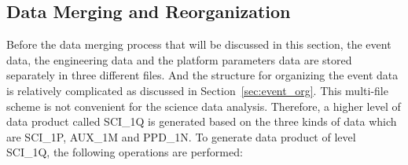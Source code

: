 \documentclass{raa}
\begin{document}
\subsection{Data Merging and Reorganization}\label{sec:data_merging}

Before the data merging process that will be discussed in this section, the event data, the engineering data and the platform parameters data are stored separately in three different files. And the structure for organizing the event data is relatively complicated as discussed in Section~\ref{sec:event_org}. This multi-file scheme is not convenient for the science data analysis. Therefore, a higher level of data product called SCI\_1Q is generated based on the three kinds of data which are SCI\_1P, AUX\_1M and PPD\_1N. To generate data product of level SCI\_1Q, the following operations are performed:
\end{document}
